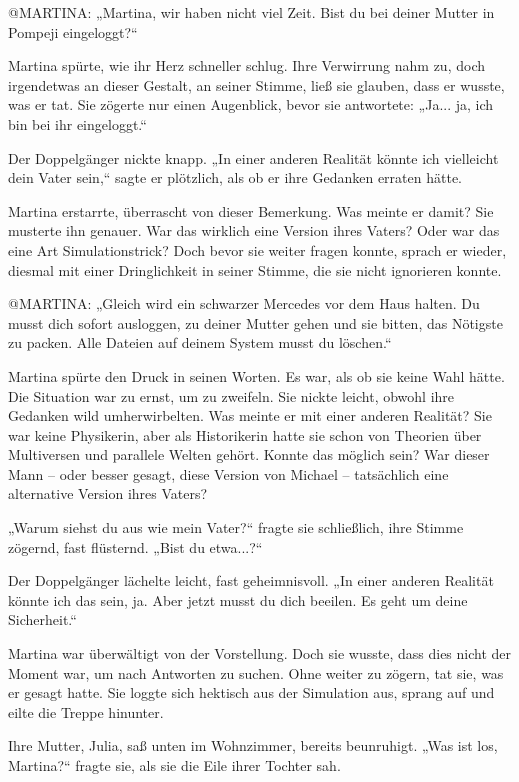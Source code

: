 \documentclass[
]{article}
\begin{document}
@MARTINA: „Martina, wir haben nicht viel Zeit. Bist du bei deiner Mutter
in Pompeji eingeloggt?{\kern0pt}``

Martina spürte, wie ihr Herz schneller schlug. Ihre Verwirrung nahm zu,
doch irgendetwas an dieser Gestalt, an seiner Stimme, ließ sie glauben,
dass er wusste, was er tat. Sie zögerte nur einen Augenblick, bevor sie
antwortete: „Ja... ja, ich bin bei ihr eingeloggt.``

Der Doppelgänger nickte knapp. „In einer anderen Realität könnte ich
vielleicht dein Vater sein,`` sagte er plötzlich, als ob er ihre
Gedanken erraten hätte.

Martina erstarrte, überrascht von dieser Bemerkung. Was meinte er damit?
Sie musterte ihn genauer. War das wirklich eine Version ihres Vaters?
Oder war das eine Art Simulationstrick? Doch bevor sie weiter fragen
konnte, sprach er wieder, diesmal mit einer Dringlichkeit in seiner
Stimme, die sie nicht ignorieren konnte.

@MARTINA: „Gleich wird ein schwarzer Mercedes vor dem Haus halten. Du
musst dich sofort ausloggen, zu deiner Mutter gehen und sie bitten, das
Nötigste zu packen. Alle Dateien auf deinem System musst du löschen.``

Martina spürte den Druck in seinen Worten. Es war, als ob sie keine Wahl
hätte. Die Situation war zu ernst, um zu zweifeln. Sie nickte leicht,
obwohl ihre Gedanken wild umherwirbelten. Was meinte er mit einer
anderen Realität? Sie war keine Physikerin, aber als Historikerin hatte
sie schon von Theorien über Multiversen und parallele Welten gehört.
Konnte das möglich sein? War dieser Mann -- oder besser gesagt, diese
Version von Michael -- tatsächlich eine alternative Version ihres
Vaters?

„Warum siehst du aus wie mein Vater?{\kern0pt}`` fragte sie schließlich,
ihre Stimme zögernd, fast flüsternd. „Bist du etwa...?{\kern0pt}``

Der Doppelgänger lächelte leicht, fast geheimnisvoll. „In einer anderen
Realität könnte ich das sein, ja. Aber jetzt musst du dich beeilen. Es
geht um deine Sicherheit.``

Martina war überwältigt von der Vorstellung. Doch sie wusste, dass dies
nicht der Moment war, um nach Antworten zu suchen. Ohne weiter zu
zögern, tat sie, was er gesagt hatte. Sie loggte sich hektisch aus der
Simulation aus, sprang auf und eilte die Treppe hinunter.

Ihre Mutter, Julia, saß unten im Wohnzimmer, bereits beunruhigt. „Was
ist los, Martina?{\kern0pt}`` fragte sie, als sie die Eile ihrer Tochter
sah.
\end{document}
